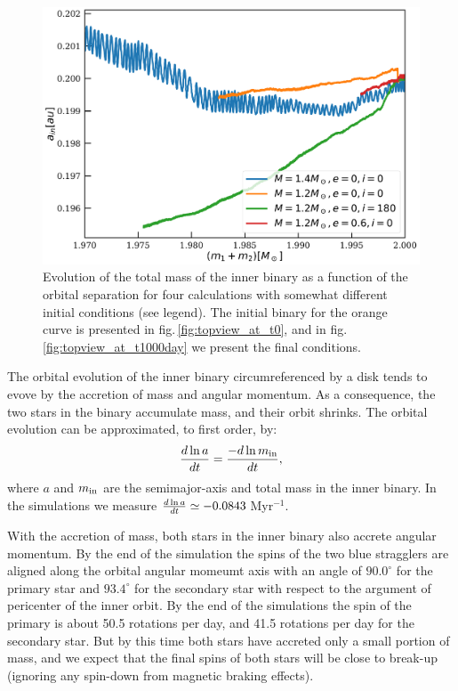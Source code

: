 \documentclass{aastex62}
\begin{document}
{\begin{figure}[ht!]
  \includegraphics[width=\columnwidth]{fig_mass_vs_semimajor_axis.pdf}
  \caption{Evolution of the total mass of the inner binary as a
    function of the orbital separation for four calculations with
    somewhat different initial conditions (see legend).  The initial
    binary for the orange curve is presented in
    fig.\,\ref{fig:topview_at_t0}, and in
    fig.\,\ref{fig:topview_at_t1000day} we present the final
    conditions.
\label{fig:mass_vs_semimajor_axis}}
\end{figure}

The orbital evolution of the inner binary circumreferenced by a disk
tends to evove by the accretion of mass and angular momentum. As a
consequence, the two stars in the binary accumulate mass, and their
orbit shrinks. The orbital evolution can be approximated, to first order, by:
\begin{equation}
  {d\ln a \over dt}   = {-d\ln m_{\rm in} \over dt},
\end{equation}
where $a$ and $m_{\rm in}$ are the semimajor-axis and total mass in
the inner binary.  In the simulations we measure ${d\ln a \over dt}
\simeq -0.0843$\,Myr$^{-1}$.

With the accretion of mass, both stars in the inner binary also accrete
angular momentum.  By the end of the simulation the spins of the two
blue stragglers are aligned along the orbital angular momeumt axis with
an angle of $90.0^\circ$ for the primary star and $93.4^\circ$ for the
secondary star with respect to the argument of pericenter of the inner
orbit.  By the end of the simulations the spin of the primary is about
50.5 rotations per day, and 41.5 rotations per day for the secondary star. But by this
time both stars have accreted only a small portion of mass, and we expect that
the final spins of both stars will be close to break-up (ignoring any spin-down from magnetic braking effects).

}
\end{document}
